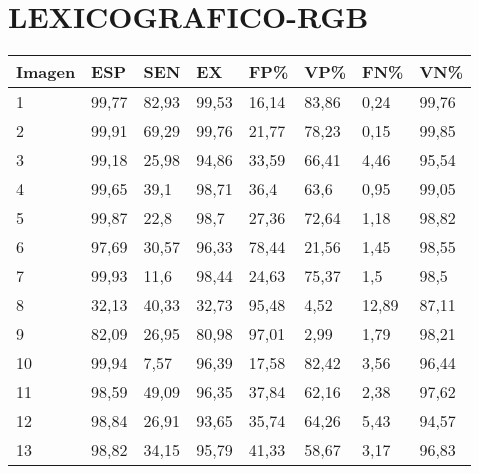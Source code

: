 \section{LEXICOGRAFICO-RGB}
\begin{longtable}[c]{|l|l|l|l|l|l|l|l|}
\hline
\textbf{Imagen} & \textbf{ESP} & \textbf{SEN} & \textbf{EX} & \textbf{FP\%} & \textbf{VP\%} & \textbf{FN\%} & \textbf{VN\%} \\ \hline
\endfirsthead
%
\endhead
%
1               & 99,77        & 82,93        & 99,53       & 16,14         & 83,86         & 0,24          & 99,76         \\ \hline
2               & 99,91        & 69,29        & 99,76       & 21,77         & 78,23         & 0,15          & 99,85         \\ \hline
3               & 99,18        & 25,98        & 94,86       & 33,59         & 66,41         & 4,46          & 95,54         \\ \hline
4               & 99,65        & 39,1         & 98,71       & 36,4          & 63,6          & 0,95          & 99,05         \\ \hline
5               & 99,87        & 22,8         & 98,7        & 27,36         & 72,64         & 1,18          & 98,82         \\ \hline
6               & 97,69        & 30,57        & 96,33       & 78,44         & 21,56         & 1,45          & 98,55         \\ \hline
7               & 99,93        & 11,6         & 98,44       & 24,63         & 75,37         & 1,5           & 98,5          \\ \hline
8               & 32,13        & 40,33        & 32,73       & 95,48         & 4,52          & 12,89         & 87,11         \\ \hline
9               & 82,09        & 26,95        & 80,98       & 97,01         & 2,99          & 1,79          & 98,21         \\ \hline
10              & 99,94        & 7,57         & 96,39       & 17,58         & 82,42         & 3,56          & 96,44         \\ \hline
11              & 98,59        & 49,09        & 96,35       & 37,84         & 62,16         & 2,38          & 97,62         \\ \hline
12              & 98,84        & 26,91        & 93,65       & 35,74         & 64,26         & 5,43          & 94,57         \\ \hline
13              & 98,82        & 34,15        & 95,79       & 41,33         & 58,67         & 3,17          & 96,83         \\ \hline

\end{longtable}
